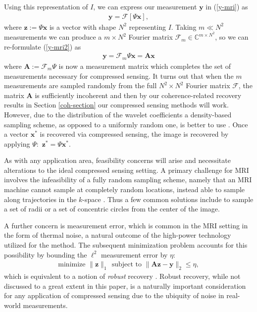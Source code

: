 \documentclass[12pt,a4paper]{amsart}
\numberwithin{equation}{section}
\theoremstyle{plain}
\theoremstyle{definition}
\newcommand{\BC}{\mathbb C}
\newcommand{\bdy}{\mathbf{y}}
\newcommand{\bdx}{\mathbf{x}}
\newcommand{\bdz}{\mathbf{z}}
\newcommand{\bdA}{\mathbf{A}}
\begin{document}
Using this representation of $I$, we can express our measurement $\bdy$ in (\ref{y-mri}) as
\begin{align}\label{y-mri2}
    \bdy=\mathcal{F}[\Psi\bdx],
\end{align}
where $\bdz:=\Psi\bdx$ is a vector with shape $N^2$ representing $I$. Taking $m\ll N^2$ measurements we can produce a $m\times N^2$ Fourier matrix $\mathcal{F}_m\in\BC^{m\times N^2}$, so we can re-formulate (\ref{y-mri2}) as 
\begin{align*}
    \bdy=\mathcal{F}_m\Psi\bdx=\bdA\bdx
\end{align*}
where $\bdA:=\mathcal{F}_m\Psi$ is now a measurement matrix which completes the set of measurements necessary for compressed sensing. It turns out that when the $m$ measurements are sampled randomly from the full $N^2\times N^2$ Fourier matrix $\mathcal{F}$, the matrix $\bdA$ is sufficiently incoherent and then by our coherence-related recovery results in Section \ref{coh-section} our compressed sensing methods will work. However, due to the distribution of the wavelet coefficients a density-based sampling scheme, as opposed to a uniformly random one, is better to use \cite{wm}. Once a vector $\bdx^*$ is recovered via compressed sensing, the image is recovered by applying $\Psi:$ $\bdz^*=\Psi\bdx^*$.

As with any application area, feasibility concerns will arise and necessitate alterations to the ideal compressed sensing setting. A primary challenge for MRI involves the infeasibility of a fully random sampling scheme, namely that an MRI machine cannot sample at completely random locations, instead able to sample along trajectories in the $k$-space \cite{wm}. Thus a few common solutions include to sample a set of radii or a set of concentric circles from the center of the image. 

A further concern is measurement error, which is common in the MRI setting in the form of thermal noise, a natural outcome of the high-power technology utilized for the method. The subsequent minimization problem accounts for this possibility by bounding the $\ell^2$ measurement error by $\eta$:
\begin{align*}
    \text{minimize }\|\bdz\|_1 \ \ \text{subject to }\|\bdA\bdz-\bdy\|_2\leq\eta,
\end{align*}
which is equivalent to a notion of \textit{robust} recovery \cite{wm, fou-rau}. Robust recovery, while not discussed to a great extent in this paper, is a naturally important consideration for any application of compressed sensing due to the ubiquity of noise in real-world measurements.
\end{document}
